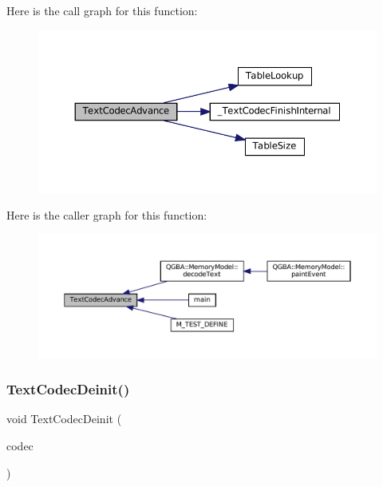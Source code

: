 Here is the call graph for this function\+:
\nopagebreak
\begin{figure}[H]
\begin{center}
\leavevmode
\includegraphics[width=350pt]{text-codec_8c_a7090f20c2a664b7bf30416d0275e6b25_cgraph}
\end{center}
\end{figure}
Here is the caller graph for this function\+:
\nopagebreak
\begin{figure}[H]
\begin{center}
\leavevmode
\includegraphics[width=350pt]{text-codec_8c_a7090f20c2a664b7bf30416d0275e6b25_icgraph}
\end{center}
\end{figure}
\mbox{\label{text-codec_8c_afbd19db66f87e92647579c2b63c941cc}} 
\subsubsection{\texorpdfstring{Text\+Codec\+Deinit()}{TextCodecDeinit()}}
{\footnotesize\ttfamily void Text\+Codec\+Deinit (\begin{DoxyParamCaption}\item[{struct Text\+Codec $\ast$}]{codec }\end{DoxyParamCaption})}

